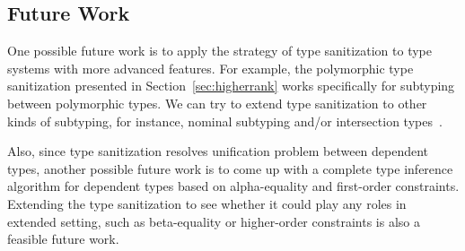 \subsection{Future Work}

One possible future work is to apply the strategy of type sanitization to type
systems with more advanced features. For example, the polymorphic type
sanitization presented in Section~\ref{sec:higherrank} works specifically for
subtyping between polymorphic types. We can try to extend type sanitization to
other kinds of subtyping, for instance, nominal subtyping and/or intersection
types~\cite{}.

Also, since type sanitization resolves unification problem between dependent
types, another possible future work is to come up with a complete type inference
algorithm for dependent types based on alpha-equality and first-order
constraints. Extending the type sanitization to see whether it could play
any roles in extended setting, such as beta-equality or higher-order constraints
is also a feasible future work.
